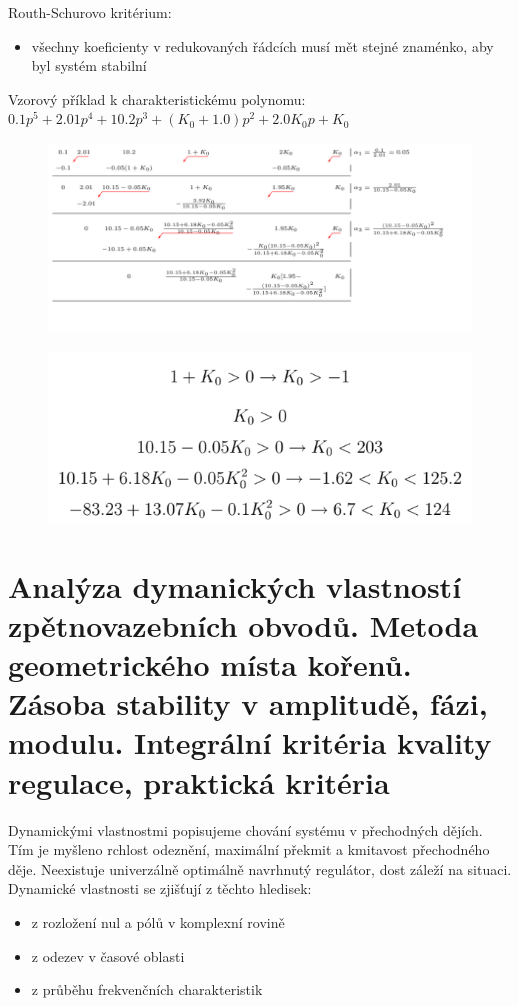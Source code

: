 Routh-Schurovo kritérium:

\begin{itemize}
    \item všechny koeficienty v redukovaných řádcích musí mět stejné znaménko, aby byl systém stabilní
\end{itemize}
Vzorový příklad k charakteristickému polynomu: $0.1p^5+2.01p^4+10.2p^3+(K_0+1.0)p^2+2.0K_0p+K_0$
\begin{figure}[H]
    \includegraphics*[scale = 1.2]{images/RouthSchur.png}
\end{figure}
\begin{figure}[H]
    \includegraphics*[scale = 1]{images/RouthSchur2.png}
\end{figure}




\section{Analýza dymanických vlastností zpětnovazebních obvodů. Metoda geometrického místa kořenů. Zásoba stability v amplitudě, fázi, modulu. Integrální kritéria kvality regulace, praktická kritéria}
Dynamickými vlastnostmi popisujeme chování systému v přechodných dějích. Tím je myšleno rchlost odeznění, maximální překmit a kmitavost přechodného děje. Neexistuje univerzálně optimálně navrhnutý regulátor, dost záleží na situaci.
Dynamické vlastnosti se zjišťují z těchto hledisek:
\begin{itemize}
    \item z rozložení nul a pólů v komplexní rovině
    \item z odezev v časové oblasti
    \item z průběhu frekvenčních charakteristik
\end{itemize}


